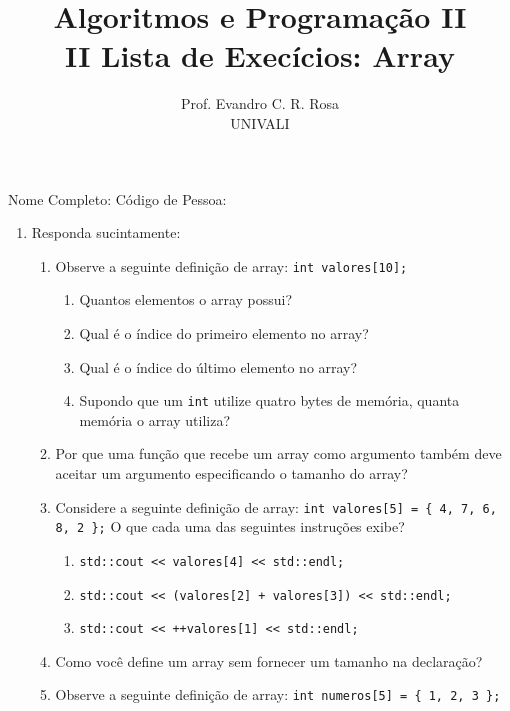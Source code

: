 \documentclass[12pt]{article}
\title{Algoritmos e Programação II\\
\large II Lista de Execícios: Array}
\author{Prof. Evandro C. R. Rosa\\UNIVALI}
\date{}
\begin{document}
\maketitle

\noindent Nome Completo: \underline{\hspace{8cm}} Código de Pessoa: \underline{\hspace{2.4cm}}

\begin{enumerate}
      \item Responda sucintamente:
            \begin{enumerate}
                  \item Observe a seguinte definição de array: \texttt{int valores[10];}
                        \begin{enumerate}
                              \item Quantos elementos o array possui?
                              \item Qual é o índice do primeiro elemento no array?
                              \item Qual é o índice do último elemento no array?
                              \item Supondo que um \texttt{int} utilize quatro bytes de memória, quanta memória o array utiliza?
                        \end{enumerate}
                  \item Por que uma função que recebe um array como argumento também deve aceitar um argumento especificando o tamanho do array?
                  \item Considere a seguinte definição de array: \texttt{int valores[5] = \{ 4, 7, 6, 8, 2 \};} O que cada uma das seguintes instruções exibe?
                        \begin{enumerate}
                              \item \texttt{std::cout << valores[4] << std::endl;}
                              \item \texttt{std::cout << (valores[2] + valores[3]) << std::endl;}
                              \item \texttt{std::cout << ++valores[1] << std::endl;}
                        \end{enumerate}
                  \item Como você define um array sem fornecer um tamanho na declaração?
                  \item Observe a seguinte definição de array: \texttt{int numeros[5] = \{ 1, 2, 3 \};}

\end{enumerate}
\end{enumerate}
\end{document}
